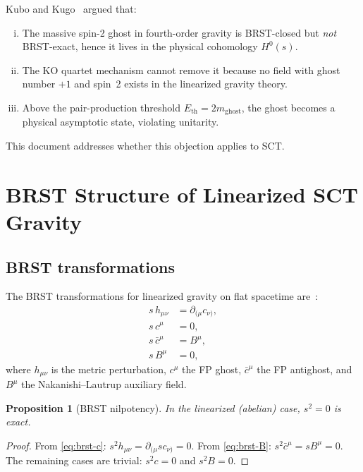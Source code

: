 \documentclass[11pt,a4paper]{article}
\newtheorem{proposition}[theorem]{Proposition}
\begin{document}
Kubo and Kugo~\cite{KuboKugo2023,KuboKugo2024} argued that:
\begin{enumerate}[(i)]
  \item The massive spin-2 ghost in fourth-order gravity is BRST-closed
    but \emph{not} BRST-exact, hence it lives in the physical cohomology
    $H^0(s)$.
  \item The KO quartet mechanism cannot remove it because no field with
    ghost number $+1$ and spin~2 exists in the linearized gravity theory.
  \item Above the pair-production threshold $E_{\text{th}} = 2m_{\text{ghost}}$,
    the ghost becomes a physical asymptotic state, violating unitarity.
\end{enumerate}

This document addresses whether this objection applies to SCT.


\section{BRST Structure of Linearized SCT Gravity}
\label{sec:brst}

\subsection{BRST transformations}

The BRST transformations for linearized gravity on flat spacetime
are~\cite{KugoOjima1978,NakanishiOjima1990}:
\begin{align}
  s\,h_{\mu\nu} &= \partial_{(\mu} c_{\nu)}, \label{eq:brst-h}\\
  s\,c^\mu &= 0, \label{eq:brst-c}\\
  s\,\bar{c}^\mu &= B^\mu, \label{eq:brst-cbar}\\
  s\,B^\mu &= 0, \label{eq:brst-B}
\end{align}
where $h_{\mu\nu}$ is the metric perturbation, $c^\mu$ the FP ghost,
$\bar{c}^\mu$ the FP antighost, and $B^\mu$ the Nakanishi--Lautrup
auxiliary field.

\begin{proposition}[BRST nilpotency]
  In the linearized (abelian) case, $s^2 = 0$ is exact.
\end{proposition}
\begin{proof}
  From \eqref{eq:brst-c}: $s^2 h_{\mu\nu} = \partial_{(\mu} s c_{\nu)} = 0$.
  From \eqref{eq:brst-B}: $s^2 \bar{c}^\mu = s B^\mu = 0$.
  The remaining cases are trivial: $s^2 c = 0$ and $s^2 B = 0$.
\end{proof}
\end{document}
